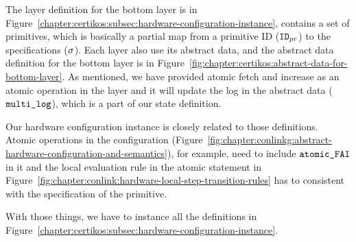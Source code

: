 The layer definition for the bottom layer is in Figure~\ref{chapter:certikos:subsec:hardware-configuration-instance},
contains a set of primitives, 
which is basically a partial map from a primitive ID (${{\mathrm{\texttt{ID}}}_{pr}}$) to the specifications ($\sigma$).
Each layer also use its abstract data, and the abstract data definition for the bottom layer is in Figure~\ref{fig:chapter:certikos:abstract-data-for-bottom-layer}.
As mentioned, 
we have provided atomic fetch and increase as an atomic operation in the layer 
and it will update the log in the abstract data (${\mathrm{\texttt{multi\_log}}}$), which is 
a part of our state definition. 

Our hardware configuration instance is closely related to those definitions. 
Atomic operations in the configuration (Figure~\ref{fig:chapter:conlinkg:abstract-hardware-configuration-and-semantics}), for example,
need to include ${\mathrm{\texttt{atomic\_FAI}}}$  
in it and the local evaluation rule in the atomic statement in Figure~\ref{fig:chapter:conlink:hardware-local-step-transition-rules}  has to 
consistent with the specification of the primitive.
%
%
%

With those things, 
we have to instance all the definitions in Figure~\ref{chapter:certikos:subsec:hardware-configuration-instance}.

